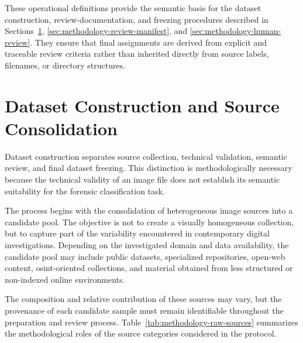 These operational definitions provide the semantic basis for the dataset
construction, review-documentation, and freezing procedures described in
Sections~\ref{sec:methodology-dataset-construction},
\ref{sec:methodology-review-manifest}, and
\ref{sec:methodology-human-review}. They ensure that final assignments are
derived from explicit and traceable review criteria rather than inherited
directly from source labels, filenames, or directory structures.

\section{Dataset Construction and Source Consolidation}
\label{sec:methodology-dataset-construction}

Dataset construction separates source collection, technical validation,
semantic review, and final dataset freezing. This distinction is
methodologically necessary because the technical validity of an image file
does not establish its semantic suitability for the forensic classification
task.

The process begins with the consolidation of heterogeneous image sources into
a candidate pool. The objective is not to create a visually homogeneous
collection, but to capture part of the variability encountered in contemporary
digital investigations. Depending on the investigated domain and data
availability, the candidate pool may include public datasets, specialized
repositories, open-web content, \gls{osint}-oriented collections, and material
obtained from less structured or non-indexed online environments.

The composition and relative contribution of these sources may vary, but the
provenance of each candidate sample must remain identifiable throughout the
preparation and review process.
Table~\ref{tab:methodology-raw-sources} summarizes the methodological roles of
the source categories considered in the protocol.

